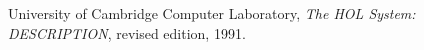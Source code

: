 \begin{thebibliography}{99}

University of Cambridge Computer Laboratory,
{\it The HOL System: DESCRIPTION}, revised edition, 1991.

\end{thebibliography}


